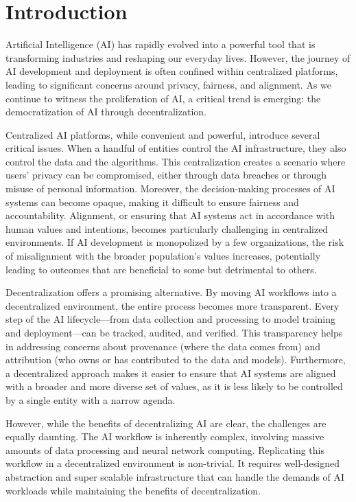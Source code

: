 \section{Introduction}

Artificial Intelligence (AI) has rapidly evolved into a powerful tool that is transforming industries and reshaping our everyday lives. 
However, the journey of AI development and deployment is often confined within centralized platforms, leading to significant concerns around privacy, fairness, and alignment. 
As we continue to witness the proliferation of AI, a critical trend is emerging: the democratization of AI through decentralization.

Centralized AI platforms, while convenient and powerful, introduce several critical issues. When a handful of entities control the AI infrastructure, they also control the data and the algorithms. 
This centralization creates a scenario where users' privacy can be compromised, either through data breaches or through misuse of personal information.
Moreover, the decision-making processes of AI systems can become opaque, making it difficult to ensure fairness and accountability. 
Alignment, or ensuring that AI systems act in accordance with human values and intentions, becomes particularly challenging in centralized environments. 
If AI development is monopolized by a few organizations, the risk of misalignment with the broader population’s values increases, potentially leading to outcomes that are beneficial to some but detrimental to others.

Decentralization offers a promising alternative. 
By moving AI workflows into a decentralized environment, the entire process becomes more transparent. 
Every step of the AI lifecycle—from data collection and processing to model training and deployment—can be tracked, audited, and verified. 
This transparency helps in addressing concerns about provenance (where the data comes from) and attribution (who owns or has contributed to the data and models). 
Furthermore, a decentralized approach makes it easier to ensure that AI systems are aligned with a broader and more diverse set of values, as it is less likely to be controlled by a single entity with a narrow agenda.

However, while the benefits of decentralizing AI are clear, the challenges are equally daunting. 
The AI workflow is inherently complex, involving massive amounts of data processing and neural network computing. 
Replicating this workflow in a decentralized environment is non-trivial. 
It requires well-designed abstraction and super scalable infrastructure that can handle the demands of AI workloads while maintaining the benefits of decentralization.


